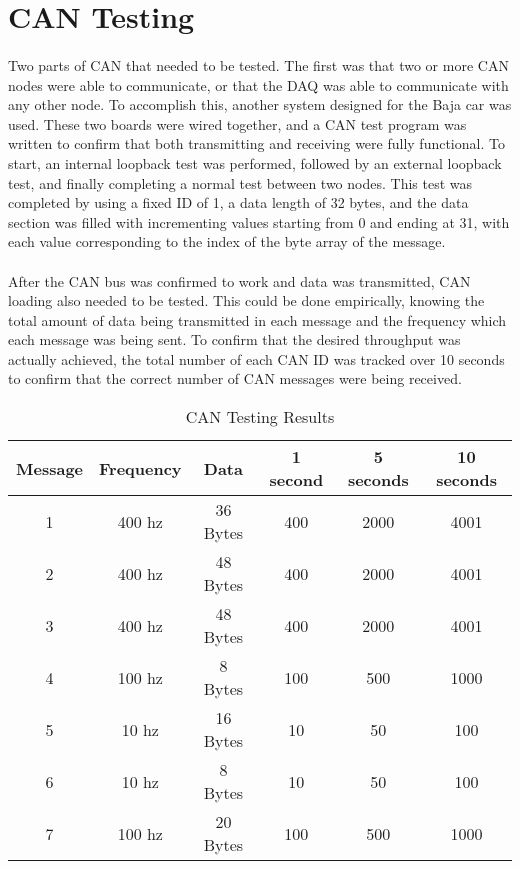 \section{CAN Testing}

\paragraph{}
Two parts of CAN that needed to be tested.
The first was that two or more CAN nodes were able to communicate, or that the DAQ was able to communicate with any other node.
To accomplish this, another system designed for the Baja car was used.
These two boards were wired together, and a CAN test program was written to confirm that both transmitting and receiving were fully functional.
To start, an internal loopback test was performed, followed by an external loopback test, and finally completing a normal test between two nodes.
This test was completed by using a fixed ID of 1, a data length of 32 bytes, and the data section was filled with incrementing values starting from 0 and ending at 31, with each value corresponding to the index of the byte array of the message.

\paragraph{}
After the CAN bus was confirmed to work and data was transmitted, CAN loading also needed to be tested.
This could be done empirically, knowing the total amount of data being transmitted in each message and the frequency which each message was being sent.
To confirm that the desired throughput was actually achieved, the total number of each CAN ID was tracked over 10 seconds to confirm that the correct number of CAN messages were being received.

\begin{table}[H] \label{table:CANTesting}
\caption{CAN Testing Results}
\centering
\begin{tabular}{c c c c c c}
\hline\hline
Message & Frequency & Data & 1 second & 5 seconds & 10 seconds \\ [0.5ex]
\hline
1 & 400 hz & 36 Bytes & 400 & 2000 & 4001 \\
2 & 400 hz & 48 Bytes & 400 & 2000 & 4001 \\
3 & 400 hz & 48 Bytes & 400 & 2000 & 4001 \\
4 & 100 hz & 8 Bytes & 100 & 500 & 1000 \\
5 & 10 hz & 16 Bytes & 10 & 50 & 100 \\
6 & 10 hz & 8 Bytes & 10 & 50 & 100 \\
7 & 100 hz & 20 Bytes & 100 & 500 & 1000 \\ [1ex]
\hline
\end{tabular}
\end{table}

